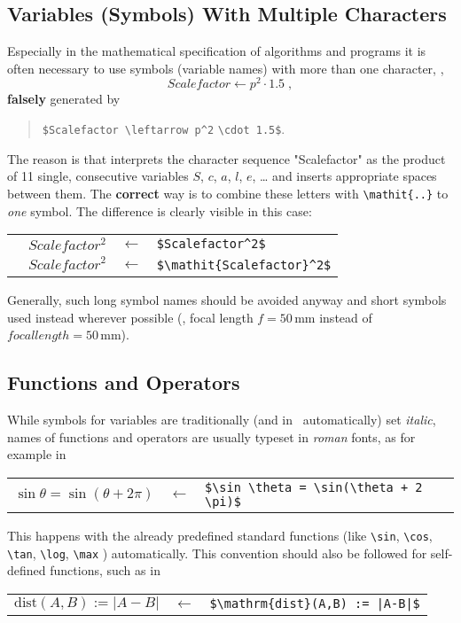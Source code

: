 \subsection{Variables (Symbols) With Multiple Characters}

Especially in the mathematical specification of algorithms and programs
it is often necessary to use symbols (variable names) with more than one
character, \eg,
%
	\[Scalefactor\leftarrow p^2 \cdot 1.5 \; ,\]
%
\textbf{falsely} generated by
%
\begin{quote}
	\verb!$Scalefactor \leftarrow p^2! \verb!\cdot 1.5$!.
\end{quote}
%
The reason is that \latex interprets the character sequence "Scalefactor" as
the product of 11 single, consecutive variables $S$, $c$, $a$, $l$, $e$, \ldots
and inserts appropriate spaces between them.
The \textbf{correct} way is to combine these letters with \verb!\mathit{..}! to 
\emph{one} symbol. The difference is clearly visible in this case:
%
\begin{center}
	\setlength{\tabcolsep}{4pt}
	\begin{tabular}{llll}
		\text{Wrong:}  & $Scalefactor^2$          & $\leftarrow$ &
		\verb!$Scalefactor^2$!          \\
		\text{Correct:} & $\mathit{Scalefactor}^2$ & $\leftarrow$ &
		\verb!$\mathit{Scalefactor}^2$!
	\end{tabular}
\end{center}
%
Generally, such long symbol names should be avoided anyway and short symbols
used instead wherever possible (\eg, focal length $f = 50 \, \mathrm{mm}$ 
instead of $\mathit{focal length} = 50 \, \mathrm{mm}$).


\subsection{Functions and Operators}

While symbols for variables are traditionally (and in \latex\ automatically)
set \emph{italic}, names of functions and operators are usually typeset in
\emph{roman} fonts, as for example in
%
\begin{center}
	\begin{tabular}{lcl}
		$\sin \theta = \sin(\theta + 2 \pi)$ &
		$\leftarrow$ & \verb!$\sin \theta = \sin(\theta + 2 \pi)$! \\
	\end{tabular}
\end{center}
%
This happens with the already predefined standard functions (like \verb!\sin!, 
\verb!\cos!, \verb!\tan!, \verb!\log!, \verb!\max! \uva) automatically.
This convention should also be followed for self-defined functions, such as in
%
\begin{center}
	\begin{tabular}{lcl}
	$\mathrm{dist}(A,B) := |A-B|$ & $\leftarrow$ & 
	\verb!$\mathrm{dist}(A,B) := |A-B|$! \\
	\end{tabular}
\end{center}


